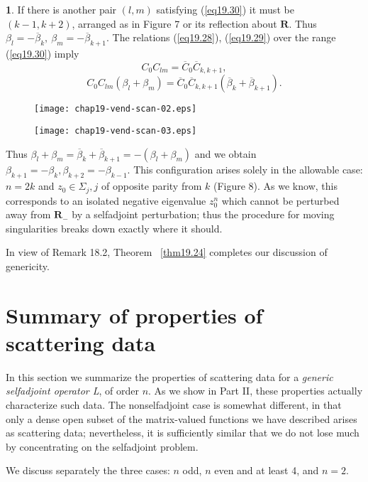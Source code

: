 \documentclass{surv-l}
\theoremstyle{plain}
\theoremstyle{definition}
\newtheorem*{pf}{\sc{Proof}}
\numberwithin{equation}{chapter}
\begin{document}
\begin{pf}
If there is another pair $(l,m)$ satisfying (\ref{eq19.30}) it must be $(k-1, k+2)$, arranged as in Figure 7 or its reflection about $\mathbf{R}$. Thus $\beta_{l}=-\overline{\beta}_{k},\ \beta_{m}=-\overline{\beta}_{k+1}$. The relations (\ref{eq19.28}), (\ref{eq19.29}) over the range (\ref{eq19.30}) imply
\begin{equation*}
C_{0}C_{lm}=\overline{C}_{0}\overline{C}_{k,k+1},
\end{equation*}
\begin{equation*}
C_{0}C_{lm}(\beta_{l}+\beta_{m})=\overline{C}_{0}\overline{C}_{k,k+1}(\overline{\beta}_{k}+\overline{\beta}_{k+1}).
\end{equation*}
\begin{figure}
\texttt{[image: chap19-vend-scan-02.eps]}
\caption{}\label{fig7}
\end{figure}
\begin{figure}
\texttt{[image: chap19-vend-scan-03.eps]}
\caption{}\label{fig8}
\end{figure}
Thus $\beta_{l}+\beta_{m}=\overline{\beta}_{k}+\overline{\beta}_{k+1}=-(\beta_{l}+\beta_{m})$ and we obtain $\beta_{k+1}=-\beta_{k},\beta_{k+2}= -\beta_{k-1}$. This configuration arises solely in the allowable case: $n=2k$ and $z_{0}\in\Sigma_{j},j$ of opposite parity from $k$ (Figure 8). As we know, this corresponds to an isolated negative eigenvalue $z_{0}^{n}$ which cannot be perturbed away from $\mathbf{R}_{-}$ by a selfadjoint perturbation; thus the procedure for moving singularities breaks down exactly where it should.
\end{pf}


In view of Remark 18.2, Theorem ~\ref{thm19.24} completes our discussion of genericity.

\section{Summary of properties of scattering data}\label{sec20} In this section we summarize the properties of scattering data for a \emph{generic selfadjoint operator L}, of order $n$. As we show in Part II, these properties actually characterize such data. The nonselfadjoint case is somewhat different, in that only a dense open subset of the matrix-valued functions we have described arises as scattering data; nevertheless, it is sufficiently similar that we do not lose much by concentrating on the selfadjoint problem.

We discuss separately the three cases: $n$ odd, $n$ even and at least 4, and $n=2$.
\end{document}
